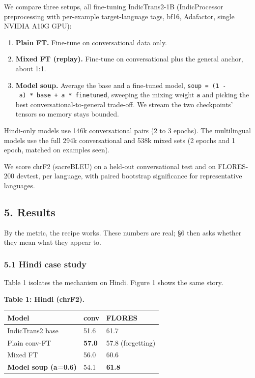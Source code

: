 \documentclass[
  11pt,
]{article}
\providecommand{\tightlist}{%
  \setlength{\itemsep}{0pt}\setlength{\parskip}{0pt}}
\begin{document}
We compare three setups, all fine-tuning IndicTrans2-1B (IndicProcessor
preprocessing with per-example target-language tags, bf16, Adafactor,
single NVIDIA A10G GPU):

\begin{enumerate}
\def\labelenumi{\arabic{enumi}.}
\tightlist
\item
  \textbf{Plain FT.} Fine-tune on conversational data only.
\item
  \textbf{Mixed FT (replay).} Fine-tune on conversational plus the
  general anchor, about 1:1.
\item
  \textbf{Model soup.} Average the base and a fine-tuned model,
  \texttt{soup\ =\ (1\ -\ a)\ *\ base\ +\ a\ *\ finetuned}, sweeping the
  mixing weight \texttt{a} and picking the best
  conversational-to-general trade-off. We stream the two checkpoints'
  tensors so memory stays bounded.
\end{enumerate}

Hindi-only models use 146k conversational pairs (2 to 3 epochs). The
multilingual models use the full 294k conversational and 538k mixed sets
(2 epochs and 1 epoch, matched on examples seen).

We score chrF2 (sacreBLEU) on a held-out conversational test and on
FLORES-200 devtest, per language, with paired bootstrap significance for
representative languages.

\hypertarget{results}{%
\subsection{5. Results}\label{results}}

By the metric, the recipe works. These numbers are real; §6 then asks
whether they mean what they appear to.

\hypertarget{hindi-case-study}{%
\subsubsection{5.1 Hindi case study}\label{hindi-case-study}}

Table 1 isolates the mechanism on Hindi. Figure 1 shows the same story.

\textbf{Table 1: Hindi (chrF2).}

\begin{longtable}[]{@{}lll@{}}
\toprule\noalign{}
Model & conv & FLORES \\
\midrule\noalign{}
\endhead
\bottomrule\noalign{}
\endlastfoot
IndicTrans2 base & 51.6 & 61.7 \\
Plain conv-FT & \textbf{57.0} & 57.8 (forgetting) \\
Mixed FT & 56.0 & 60.6 \\
\textbf{Model soup (a=0.6)} & 54.1 & \textbf{61.8} \\
\end{longtable}
\end{document}
